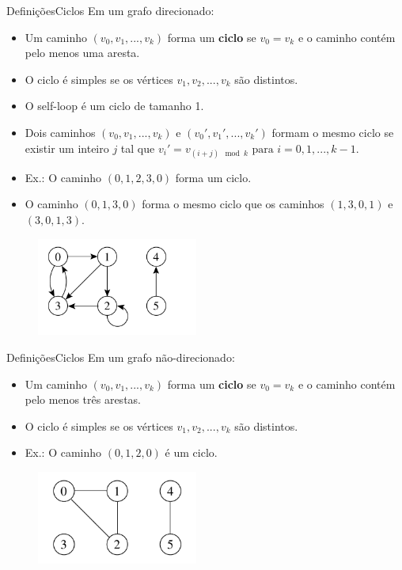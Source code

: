 \documentclass[aspectratio=169]{beamer}
\begin{document}

\begin{frame}{Definições}{Ciclos}
Em um grafo direcionado:
\begin{itemize}
\item Um caminho $(v_0 , v_1 , ... , v_k )$ forma um {\bf ciclo} se $v_0 = v_k$ e o caminho contém pelo menos uma aresta.
\item O ciclo é simples se os vértices $v_1, v_2 , ... , v_k$ são distintos.
\item O self-loop é um ciclo de tamanho 1.
\item Dois caminhos $(v_0 , v_1 , ... , v_k )$ e $(v_0', v_1' , ... , v_k')$ formam o mesmo ciclo se existir um inteiro $j$ tal que $v_{i}' = v_{(i+j) \mod k} \textrm{ para } i = 0, 1, ... , k - 1$.
\item Ex.: O caminho $(0, 1, 2, 3, 0)$ forma um ciclo.
\item O caminho $(0, 1, 3, 0)$ forma o mesmo ciclo que os caminhos $(1, 3, 0, 1)$ e $(3, 0, 1, 3)$.
\end{itemize}
\begin{figure}[!h]
  \centering
  \includegraphics[width=150pt]{imagens/exemplo_grafo_direcionado.png}
  \label{fig_exemplo_ciclo}
\end{figure}
\end{frame}


\begin{frame}{Definições}{Ciclos}
Em um grafo não-direcionado:
\begin{itemize}
\item Um caminho $(v_0 , v_1 , ... , v_k )$ forma um {\bf ciclo} se $v_0 = v_k$ e o caminho contém pelo menos três arestas.
\item O ciclo é simples se os vértices $v_1 , v_2 , ..., v_k$ são distintos.
\item Ex.: O caminho $(0, 1, 2, 0)$ é um ciclo.
\end{itemize}
\begin{figure}[!h]
  \centering
  \includegraphics[width=150pt]{imagens/exemplo_grafo_nao_direcionado.png}
  \label{fig_exemplo_ciclo_grafo_nao_direcionado}
\end{figure}
\end{frame}
\end{document}
